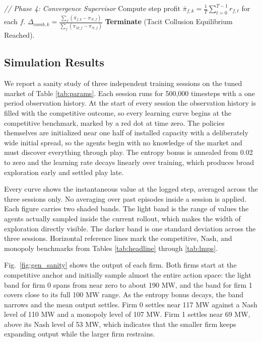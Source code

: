 \documentclass[lettersize,journal]{IEEEtran}
\begin{document}
\begin{algorithm}[H]
\begin{algorithmic}[1]
    \STATE \textit{// Phase 4: Convergence Supervisor}
    \STATE Compute step profit $\bar{\pi}_{f,k} = \frac{1}{T} \sum_{t=0}^{T-1} r_{f,t}$ for each $f$.
    \STATE $\Delta_{comb, k} = \frac{\sum_f (\bar{\pi}_{f,k} - \pi_{N,f})}{\sum_f (\pi_{M,f} - \pi_{N,f})}$
        \STATE \textbf{Terminate} (Tacit Collusion Equilibrium Reached).
    \ENDIF
\ENDFOR
\end{algorithmic}
\end{algorithm}

\subsection{Simulation Results}

We report a sanity study of three independent training sessions on the tuned market of Table \ref{tab:params}. Each session runs for 500{,}000 timesteps with a one period observation history. At the start of every session the observation history is filled with the competitive outcome, so every learning curve begins at the competitive benchmark, marked by a red dot at time zero. The policies themselves are initialized near one half of installed capacity with a deliberately wide initial spread, so the agents begin with no knowledge of the market and must discover everything through play. The entropy bonus is annealed from 0.02 to zero and the learning rate decays linearly over training, which produces broad exploration early and settled play late.

Every curve shows the instantaneous value at the logged step, averaged across the three sessions only. No averaging over past episodes inside a session is applied. Each figure carries two shaded bands. The light band is the range of values the agents actually sampled inside the current rollout, which makes the width of exploration directly visible. The darker band is one standard deviation across the three sessions. Horizontal reference lines mark the competitive, Nash, and monopoly benchmarks from Tables \ref{tab:headline} through \ref{tab:lmps}.

Fig.~\ref{fig:gen_sanity} shows the output of each firm. Both firms start at the competitive anchor and initially sample almost the entire action space: the light band for firm 0 spans from near zero to about 190 MW, and the band for firm 1 covers close to its full 100 MW range. As the entropy bonus decays, the band narrows and the mean output settles. Firm 0 settles near 117 MW against a Nash level of 110 MW and a monopoly level of 107 MW. Firm 1 settles near 69 MW, above its Nash level of 53 MW, which indicates that the smaller firm keeps expanding output while the larger firm restrains.
\end{document}
